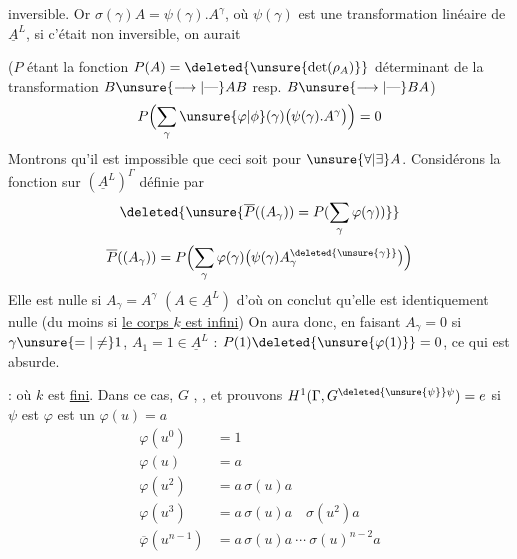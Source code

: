 inversible. Or $\sigma(\gamma)A=\psi(\gamma).A^\gamma$, où $\psi(\gamma)$ est une transformation linéaire de $\underline A^L$, si c'était non inversible, on aurait 

($P$ étant la fonction  $P(A)=\deleted{\unsure{\det(\rho_A)}}$   déterminant de la transformation $B\unsure{\longrightarrow|\text{---}}AB$ resp. $B\unsure{\longrightarrow|\text{---}}BA$)
\[
P\Bigl(\sum_\gamma \unsure{\varphi|\phi}(\gamma)\bigl(\psi(\gamma).A^\gamma\bigr)\Bigr)=0
\]
Montrons qu'il est impossible que ceci soit   pour $\unsure{\forall|\exists} A$. Considérons la fonction sur $(\underline A^L)^\Gamma$ définie par
\[
\deleted{\unsure{\overline P((A_\gamma))=P(\sum_\gamma\varphi(\gamma))}}
\]
\[
\overline P((A_\gamma))=P\Bigl(\sum_\gamma\varphi(\gamma)\bigl(\psi(\gamma)A_\gamma^{\deleted{\unsure{\gamma}}}\bigr)\Bigr)
\]
Elle est nulle si  $A_\gamma=A^\gamma$ $(A\in\underline A^L)$ d'où on conclut qu'elle est identiquement nulle (du moins si \uline{le corps $k$ est infini})
On aura donc, en faisant $A_\gamma=0$ si $\gamma\unsure{=|\ne}1$, $A_1=1\in\underline A^L$ : $P(1)\deleted{\unsure{\varphi(1)}}=0$, ce qui est absurde.

 :  où $k$ est \uline{fini}. Dans ce cas,   $G$  ,  \uline{}, et prouvons $H^1(\Gamma,G^{\deleted{\unsure{\psi}}\psi})=e$ si $\psi$ est
$\varphi$ est un   $\varphi(u)=a$
\[
\begin{aligned}
\varphi(u^0)&=1\\
\varphi(u)&=a\\
\varphi(u^2)&=a\,\sigma(u)a\\
\varphi(u^3)&=a\,\sigma(u)a\quad\sigma(u^2)a\\
\overline\varphi(u^{n-1})&=a\,\sigma(u)a\ \cdots\ \sigma(u)^{n-2}a
\end{aligned}
\]
